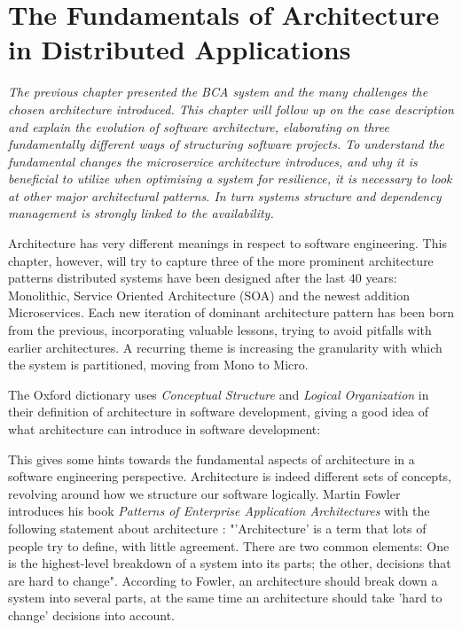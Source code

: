 \chapter{The Fundamentals of Architecture in Distributed Applications}
\label{ch:architecture}

\textit{The previous chapter presented the BCA system and the many challenges the chosen architecture introduced. This chapter will follow up on the case description and explain the evolution of software architecture, elaborating on three fundamentally different ways of structuring software projects. To understand the fundamental changes the microservice architecture introduces, and why it is beneficial to utilize when optimising a system for resilience, it is necessary to look at other major architectural patterns. In turn systems structure and dependency management is strongly linked to the availability.}

Architecture has very different meanings in respect to software engineering. This chapter, however, will try to capture three of the more prominent architecture patterns distributed systems have been designed after the last 40 years: Monolithic, Service Oriented Architecture (SOA) and the newest addition Microservices. Each new iteration of dominant architecture pattern has been born from the previous, incorporating valuable lessons, trying to avoid pitfalls with earlier architectures. A recurring theme is increasing the granularity with which the system is partitioned, moving from Mono to Micro.

The Oxford dictionary uses \textit{Conceptual Structure} and \textit{Logical Organization} in their definition of architecture in software development, giving a good idea of what architecture can introduce in software development:
 
 
This gives some hints towards the fundamental aspects of architecture in a software engineering perspective. Architecture is indeed different sets of concepts, revolving around how we structure our software logically. Martin Fowler introduces his book \textit{Patterns of Enterprise Application Architectures} with the following statement about architecture \cite[p.~1]{fowler2002patterns}: "'Architecture' is a term that lots of people try to define, with little agreement. There are two common elements: One is the highest-level breakdown of a system into its parts; the other, decisions that are hard to change". According to Fowler, an architecture should break down a system into several parts, at the same time an architecture should take 'hard to change' decisions into account. 

